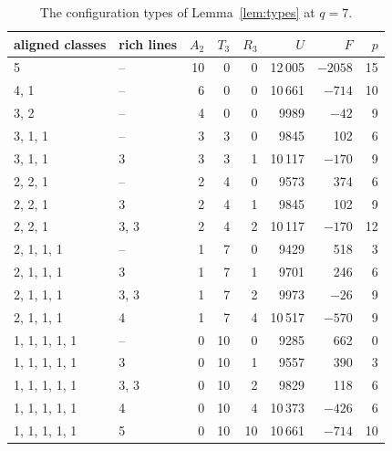 \documentclass[11pt]{amsart}
\theoremstyle{definition}
\theoremstyle{remark}
\numberwithin{equation}{section}
\begin{document}
\begin{table}[ht]
\caption{The configuration types of Lemma~\ref{lem:types} at $q=7$.}\label{tab:types}
\begin{tabular}{@{}l l r r r r r r@{}}
\toprule aligned classes & rich lines & $A_2$ & $T_3$ & $R_3$ & $U$ & $F$ & $p$\\ \midrule
5 & -- & 10 & 0 & 0 & 12\,005 & $-2058$ & 15\\
4, 1 & -- & 6 & 0 & 0 & 10\,661 & $-714$ & 10\\
3, 2 & -- & 4 & 0 & 0 & 9989 & $-42$ & 9\\
3, 1, 1 & -- & 3 & 3 & 0 & 9845 & 102 & 6\\
3, 1, 1 & 3 & 3 & 3 & 1 & 10\,117 & $-170$ & 9\\
2, 2, 1 & -- & 2 & 4 & 0 & 9573 & 374 & 6\\
2, 2, 1 & 3 & 2 & 4 & 1 & 9845 & 102 & 9\\
2, 2, 1 & 3, 3 & 2 & 4 & 2 & 10\,117 & $-170$ & 12\\
2, 1, 1, 1 & -- & 1 & 7 & 0 & 9429 & 518 & 3\\
2, 1, 1, 1 & 3 & 1 & 7 & 1 & 9701 & 246 & 6\\
2, 1, 1, 1 & 3, 3 & 1 & 7 & 2 & 9973 & $-26$ & 9\\
2, 1, 1, 1 & 4 & 1 & 7 & 4 & 10\,517 & $-570$ & 9\\
1, 1, 1, 1, 1 & -- & 0 & 10 & 0 & 9285 & 662 & 0\\
1, 1, 1, 1, 1 & 3 & 0 & 10 & 1 & 9557 & 390 & 3\\
1, 1, 1, 1, 1 & 3, 3 & 0 & 10 & 2 & 9829 & 118 & 6\\
1, 1, 1, 1, 1 & 4 & 0 & 10 & 4 & 10\,373 & $-426$ & 6\\
1, 1, 1, 1, 1 & 5 & 0 & 10 & 10 & 10\,661 & $-714$ & 10\\ \bottomrule
\end{tabular}
\end{table}
\end{document}
